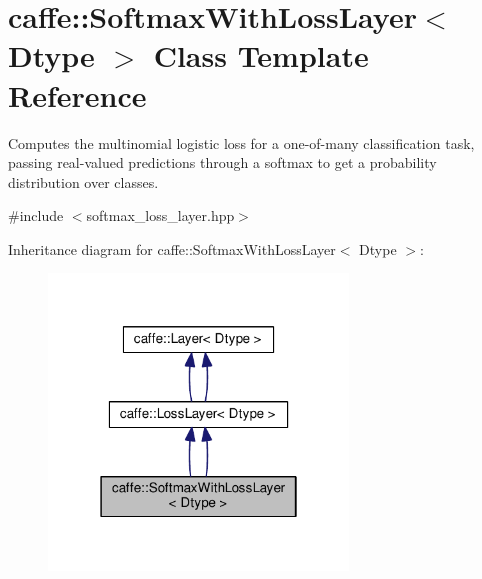 \hypertarget{classcaffe_1_1_softmax_with_loss_layer}{}\section{caffe\+:\+:Softmax\+With\+Loss\+Layer$<$ Dtype $>$ Class Template Reference}
\label{classcaffe_1_1_softmax_with_loss_layer}


Computes the multinomial logistic loss for a one-\/of-\/many classification task, passing real-\/valued predictions through a softmax to get a probability distribution over classes.  




{\ttfamily \#include $<$softmax\+\_\+loss\+\_\+layer.\+hpp$>$}



Inheritance diagram for caffe\+:\+:Softmax\+With\+Loss\+Layer$<$ Dtype $>$\+:
\nopagebreak
\begin{figure}[H]
\begin{center}
\leavevmode
\includegraphics[width=226pt]{classcaffe_1_1_softmax_with_loss_layer__inherit__graph}
\end{center}
\end{figure}
